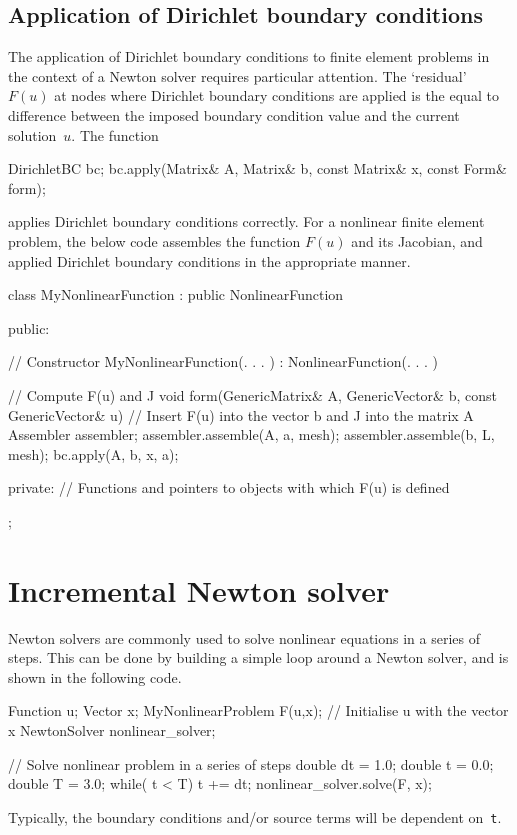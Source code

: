 \subsection{Application of Dirichlet boundary conditions}
%
The application of Dirichlet boundary conditions to finite element
problems in the context of a Newton solver requires particular 
attention. The `residual' $F(u)$ at nodes where Dirichlet boundary
conditions are applied is the equal to difference between the 
imposed boundary condition value and the current solution~$u$.
The function 
%
{\small
\begin{code}
DirichletBC bc;
bc.apply(Matrix& A, Matrix& b, const Matrix& x, const Form& form);
\end{code}
}
%
applies Dirichlet boundary conditions correctly. For a nonlinear
finite element problem, the below code assembles the function $F(u)$
and its Jacobian, and applied Dirichlet boundary conditions in the
appropriate manner.
%
\small
\begin{code}
class MyNonlinearFunction : public NonlinearFunction
{
public: 
  
  // Constructor 
  MyNonlinearFunction(. . . ) : NonlinearFunction(. . . ) {}
  
  // Compute F(u) and J 
  void form(GenericMatrix& A, GenericVector& b, 
            const GenericVector& u)
  {
    // Insert F(u) into the vector b and J into the matrix A 
    Assembler assembler;
    assembler.assemble(A, a, mesh);
    assembler.assemble(b, L, mesh);
    bc.apply(A, b, x, a);
  }

private:
  // Functions and pointers to objects with which F(u) is defined
};
\end{code}
\normalsize
\section{Incremental Newton solver}
%
Newton solvers are commonly used to solve nonlinear equations in a series 
of steps. This can be done by building a simple loop around a Newton solver,
and is shown in the following code.
%
{
\begin{code}
Function u;
Vector x;
MyNonlinearProblem F(u,x); // Initialise u with the vector x
NewtonSolver nonlinear_solver;

// Solve nonlinear problem in a series of steps
double dt = 1.0; double t  = 0.0; double T  = 3.0;
while( t < T)
{
  t += dt;
  nonlinear_solver.solve(F, x);
}
\end{code}
}
%
Typically, the boundary conditions and/or source terms will be dependent 
on~\texttt{t}.
